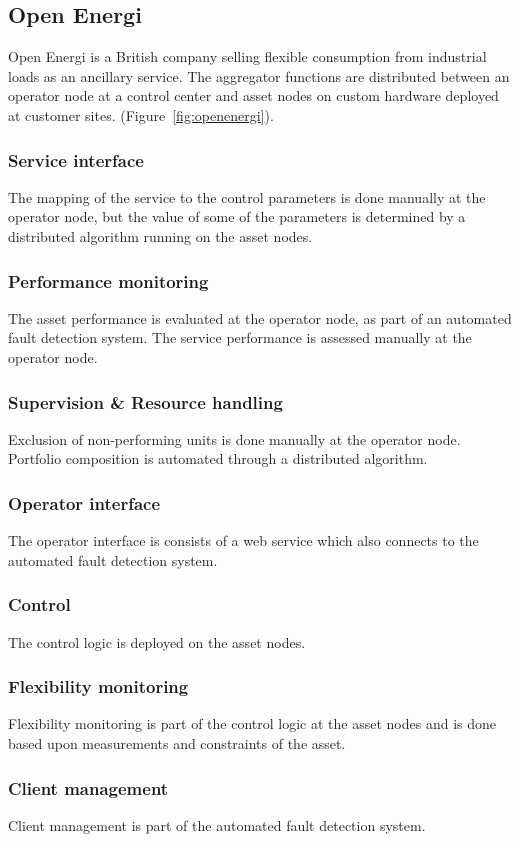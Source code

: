 \subsection{Open Energi}
Open Energi is a British company selling flexible consumption from industrial loads as an ancillary service. The aggregator functions are distributed between an operator node at a control center and asset nodes on custom hardware deployed at customer sites. (Figure~\ref{fig:openenergi}).

\subsubsection{Service interface}
The mapping of the service to the control parameters is done manually at the operator node, but the value of some of the parameters is determined by a distributed algorithm running on the asset nodes.
\subsubsection{Performance monitoring}
The asset performance is evaluated at the operator node, as part of an automated fault detection system. The service performance is assessed manually at the operator node.
\subsubsection{Supervision \& Resource handling}
Exclusion of non-performing units is done manually at the operator node. Portfolio composition is automated through a distributed algorithm.
\subsubsection{Operator interface}
The operator interface is consists of a web service which also connects to the automated fault detection system. 
\subsubsection{Control}
The control logic is deployed on the asset nodes.
\subsubsection{Flexibility monitoring}
Flexibility monitoring is part of the control logic at the asset nodes and is done based upon measurements and constraints of the asset.
\subsubsection{Client management}
Client management is part of the automated fault detection system.
